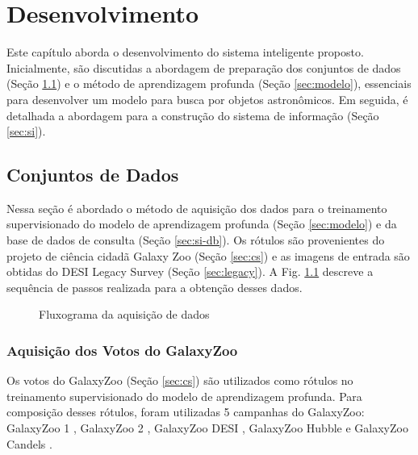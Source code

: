 \chapter{Desenvolvimento}
\label{cap:desenvolvimento}

Este capítulo aborda o desenvolvimento do sistema inteligente proposto.  Inicialmente, são  discutidas a abordagem de preparação dos conjuntos de dados (Seção \ref{sec:aquisicao}) e o método de aprendizagem profunda (Seção \ref{sec:modelo}), essenciais para desenvolver um modelo para busca por objetos astronômicos. Em seguida, é detalhada a abordagem para a construção do sistema de informação (Seção \ref{sec:si}).

\section{Conjuntos de Dados}
\label{sec:aquisicao}

Nessa seção é abordado o método de aquisição dos dados para o treinamento supervisionado do modelo de aprendizagem profunda (Seção \ref{sec:modelo}) e da base de dados de consulta (Seção \ref{sec:si-db}). Os rótulos são provenientes do projeto de ciência cidadã Galaxy Zoo (Seção \ref{sec:cs}) e as imagens de entrada são obtidas do DESI Legacy Survey (Seção \ref{sec:legacy}). A Fig. \ref{fig:flow-aquisicao} descreve a sequência de passos realizada para a obtenção desses dados.

\begin{figure}[!ht]
  \centering
  \caption{Fluxograma da aquisição de dados}
  \label{fig:flow-aquisicao}
\end{figure}

\subsection{Aquisição dos Votos do GalaxyZoo}
\label{sec:aquisicao-zoo}

Os votos do GalaxyZoo (Seção \ref{sec:cs}) são utilizados como rótulos no treinamento supervisionado do modelo de aprendizagem profunda. Para composição desses rótulos, foram utilizadas 5 campanhas do GalaxyZoo: GalaxyZoo 1 \cite{gz1}, GalaxyZoo 2 \cite{gz2,gz2-bias}, GalaxyZoo DESI \cite{gz-decals,gz-desi}, GalaxyZoo Hubble \cite{gz-hubble} e GalaxyZoo Candels \cite{gz-candels}.

